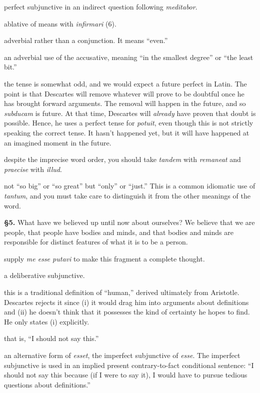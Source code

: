  perfect subjunctive in an indirect question following \textit{meditabor}.

 ablative of means with \textit{infirmari} (6).

 adverbial rather than a conjunction. It means ``even.''

 an adverbial use of the accusative, meaning ``in the smallest degree'' or ``the least bit.''

 the tense is somewhat odd, and we would expect a future perfect in Latin. The point is that Descartes will remove whatever will prove to be doubtful once he has brought forward arguments. The removal will happen in the future, and so \textit{subducam} is future. At that time, Descartes will \textit{already} have proven that doubt is possible. Hence, he uses a perfect tense for \textit{potuit}, even though this is not strictly speaking the correct tense. It hasn't happened yet, but it will have happened at an imagined moment in the future.

 despite the imprecise word order, you should take \textit{tandem} with \textit{remaneat} and \textit{praecise} with \textit{illud}.

 not ``so big'' or ``so great'' but ``only'' or ``just.'' This is a common idiomatic use of \textit{tantum}, and you must take care to distinguish it from the other meanings of the word.

\textbf{§5.} What have we believed up until now about ourselves? We believe that we are people, that people have bodies and minds, and that bodies and minds are responsible for distinct features of what it is to be a person.

 supply \textit{me esse putavi} to make this fragment a complete thought.

 a deliberative subjunctive.

 this is a traditional definition of ``human,'' derived ultimately from Aristotle. Descartes rejects it since (i) it would drag him into arguments about definitions and (ii) he doesn't think that it possesses the kind of certainty he hopes to find. He only states (i) explicitly.

 that is, ``I should not say this.''

 an alternative form of \textit{esset}, the imperfect subjunctive of \textit{esse}. The imperfect subjunctive is used in an implied present contrary-to-fact conditional sentence: ``I should not say this because (if I were to say it), I would have to pursue tedious questions about definitions.''

